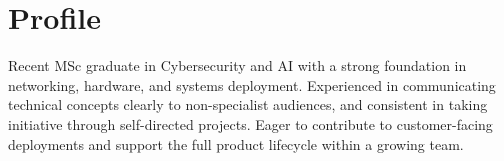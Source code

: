 \section{Profile}
Recent MSc graduate in Cybersecurity and AI with a strong foundation in networking, hardware, and systems deployment. Experienced in communicating technical concepts clearly to non-specialist audiences, and consistent in taking initiative through self-directed projects. Eager to contribute to customer-facing deployments and support the full product lifecycle within a growing team.